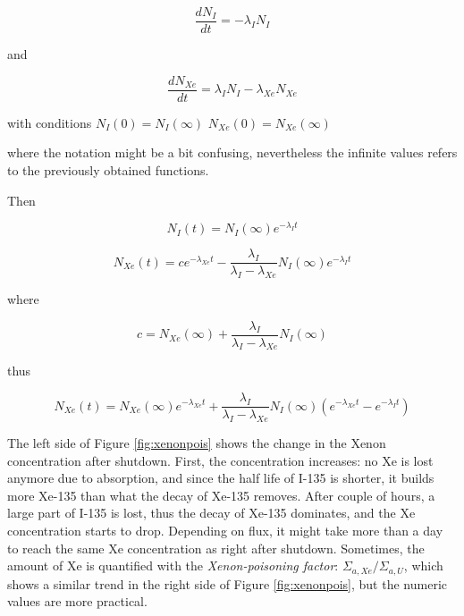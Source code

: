 $$ \frac{dN_I}{dt}=-\lambda_IN_I $$

\noindent and

$$ \frac{dN_{Xe}}{dt}= \lambda_IN_I -\lambda_{Xe}N_{Xe} $$

\noindent with conditions $N_I(0)=N_I(\infty)$ $N_{Xe}(0)=N_{Xe}(\infty)$

\noindent where the notation might be a bit confusing, nevertheless the infinite values refers to the previously obtained functions.

Then

$$ N_I(t)=N_I(\infty)e^{-\lambda_It} $$

$$ N_{Xe}(t) = c e^{-\lambda_{Xe}t} - \frac{\lambda_I}{\lambda_I - \lambda_{Xe}}N_I(\infty)e^{-\lambda_{I}t} $$

\noindent where

$$ c = N_{Xe}(\infty)+\frac{\lambda_I}{\lambda_I - \lambda_{Xe}}N_I(\infty) $$

\noindent thus


$$ N_{Xe} (t) = N_{Xe}(\infty)e^{-\lambda_{Xe}t}+\frac{\lambda_I}{\lambda_I - \lambda_{Xe}}N_I(\infty)(e^{-\lambda_{Xe}t} - e^{-\lambda_{I}t}) $$

The left side of Figure \ref{fig:xenonpois} shows the change in the Xenon concentration after shutdown. First, the concentration increases: no Xe is lost anymore due to absorption, and since the half life of I-135 is shorter, it builds more Xe-135 than what the decay of Xe-135 removes. After couple of hours, a large part of I-135 is lost, thus the decay of Xe-135 dominates, and the Xe concentration starts to drop. Depending on flux, it might take more than a day to reach the same Xe concentration as right after shutdown. Sometimes, the amount of Xe is quantified with the \textit{Xenon-poisoning factor}: $\Sigma_{a,Xe}/\Sigma_{a,U}$, which shows a similar trend in the right side of Figure \ref{fig:xenonpois}, but the numeric values are more practical.


